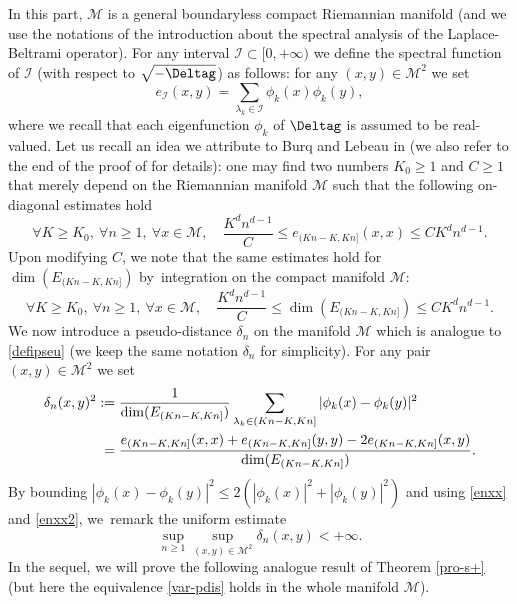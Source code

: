 In this part, $\mathcal{M}$ is a general boundaryless compact Riemannian manifold (and we use the notations of the introduction about the spectral analysis of the Laplace-Beltrami operator). For any interval $\mathcal{I}\subset [0,+\infty)$ we define the spectral function of $\mathcal{I}$ (with respect to $\sqrt{-\Deltag}$) as follows: for any $(x,y)\in \mathcal{M}^2$ we set
\begin{equation*}
e_{\mathcal{I}}(x,y)=\sum_{\lambda_k\in \mathcal{I}} \phi_k(x)\phi_k(y),
\end{equation*}
where we recall that each eigenfunction $\phi_k$ of $\Deltag$ is assumed to be real-valued.
Let us recall an idea we attribute to Burq and Lebeau in \cite[p.\,923]{burq-lebeau} (we also refer to the end of the proof of \cite[Lem.\,8.1]{imek-aif} for details): one may find two numbers $K_0\geq 1$ and $C\geq 1$ that merely depend on the Riemannian manifold $\mathcal{M}$ such that the following on-diagonal estimates hold
\begin{equation}\label{enxx}
\forall K \geq K_0,\ \forall n\geq 1,\ \forall x\in \mathcal{M}, \quad \frac{K^{d} n^{d-1}}{C}\leq e_{(Kn-K,Kn]}(x,x)\leq
CK^{d} n^{d-1}.
\end{equation}
Upon modifying $C$, we note that the same estimates hold for $\dim(E_{(Kn-K,Kn]})$ by~integration on the compact manifold $\mathcal{M}$:
\begin{equation}\label{enxx2}
\forall K \geq K_0,\ \forall n\geq 1,\ \forall x\in \mathcal{M}, \quad \frac{K^{d} n^{d-1}}{C}\leq
\dim(E_{(Kn-K,Kn]})\leq CK^{d} n^{d-1}.
\end{equation}
We now introduce a pseudo-distance $\delta_n$ on the manifold $\mathcal{M}$ which is analogue to \eqref{defipseu} (we keep the same notation $\delta_n$ for simplicity).
For any pair $(x,y)\in \mathcal{M}^2$ we set
\begin{align}\label{defideltan}
\delta_n(x,y)^2&:=\frac{1}{\dim(E_{(Kn-K,Kn]})}\sum_{\lambda_k\in (Kn-K,Kn]}|\phi_{k}(x)-\phi_{k}(y)|^2 \\ \label{defideltan2}
& \hphantom{:}= \frac{e_{(Kn-K,Kn]}(x,x)+e_{(Kn-K,Kn]}(y,y)-2e_{(Kn-K,Kn]}(x,y) }{\dim(E_{(Kn-K,Kn]})}.
\end{align}
By bounding $|\phi_k(x)-\phi_k(y)|^2 \leq 2(|\phi_k(x)|^2+|\phi_k(y)|^2)$ and using \eqref{enxx} and \eqref{enxx2}, we~remark the uniform estimate
\begin{equation}\label{uniff}
\sup_{n\geq 1} \sup_{(x,y)\in \mathcal{M}^2} \delta_n(x,y)<+\infty.
\end{equation}
In the sequel, we will prove the following analogue result of Theorem \ref{pro-s+} (but here the equivalence \eqref{var-pdis} holds in the whole manifold $\mathcal{M}$).

